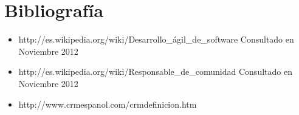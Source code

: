 \chapter*{Bibliograf\'ia}
\begin{itemize}
	\item http://es.wikipedia.org/wiki/Desarrollo\_\'agil\_de\_software Consultado en Noviembre 2012
	\item http://es.wikipedia.org/wiki/Responsable\_de\_comunidad Consultado en Noviembre 2012
	\item http://www.crmespanol.com/crmdefinicion.htm
\end{itemize}